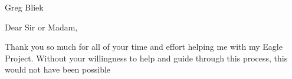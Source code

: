 \documentclass[11pt, letterpaper]{letter}
\begin{document}

\begin{letter}{
	Greg Bliek
}

\opening{Dear Sir or Madam,}

Thank you so much for all of your time and effort helping me with my Eagle Project. Without your willingness to help and guide through this process, this would not have been possible



\end{letter}
\end{document}
